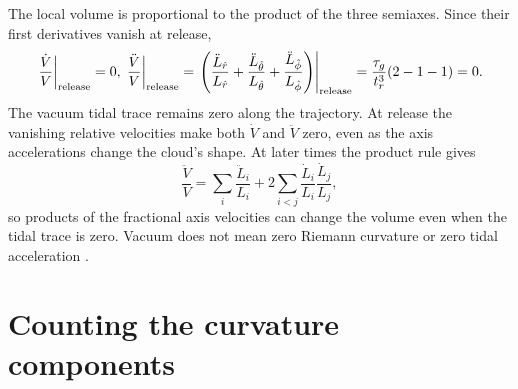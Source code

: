 \documentclass[12pt]{article}
\begin{document}
The local volume is proportional to the product of the three semiaxes. Since their first derivatives vanish at release,
\begin{equation}
  \left.\frac{\dot V}{V}\right|_{\rm release}=0,\\
  \left.\frac{\ddot V}{V}\right|_{\rm release}
  =\left.\left(
    \frac{\ddot L_{\hat r}}{L_{\hat r}}
    +\frac{\ddot L_{\hat\theta}}{L_{\hat\theta}}
    +\frac{\ddot L_{\hat\phi}}{L_{\hat\phi}}
  \right)\right|_{\rm release}
  =\frac{\tau_g}{t_r^3}(2-1-1)=0.
  \label{eq:volume-acceleration}
\end{equation}
The vacuum tidal trace remains zero along the trajectory. At release the vanishing relative velocities make both $\dot V$ and $\ddot V$ zero, even as the axis accelerations change the cloud's shape. At later times the product rule gives
\begin{equation}
  \frac{\ddot V}{V}=\sum_i\frac{\ddot L_i}{L_i}
  +2\sum_{i<j}\frac{\dot L_i}{L_i}\frac{\dot L_j}{L_j},
  \label{eq:volume-product-rule}
\end{equation}
so products of the fractional axis velocities can change the volume even when the tidal trace is zero. Vacuum does not mean zero Riemann curvature or zero tidal acceleration \cite{TongGR}.

\section{Counting the curvature components}
\label{sec:curvature-components}
\end{document}
